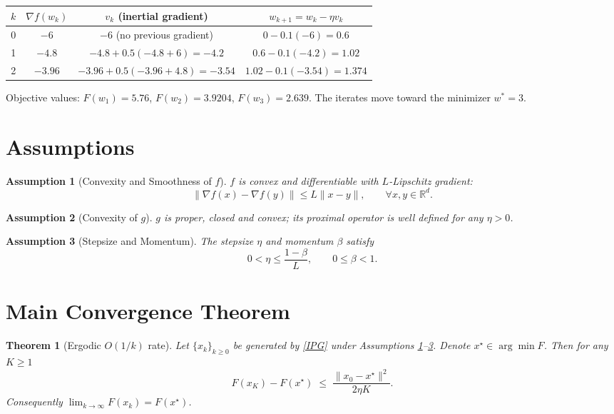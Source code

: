 \documentclass{article}
\newtheorem{theorem}{Theorem}
\newtheorem{assumption}{Assumption}
\newcommand{\R}{\mathbb{R}}
\begin{document}
\begin{center}
\begin{tabular}{c|c|c|c}
$k$ & $\nabla f(w_k)$ & $v_k$ (inertial gradient) & $w_{k+1}=w_k-\eta v_k$ \\ \hline
0 & $-6$ & $-6$ (no previous gradient) & $0-0.1(-6)=0.6$ \\[0.2em]
1 & $-4.8$ & $-4.8+0.5(-4.8+6)=-4.2$ & $0.6-0.1(-4.2)=1.02$ \\[0.2em]
2 & $-3.96$ & $-3.96+0.5(-3.96+4.8)=-3.54$ & $1.02-0.1(-3.54)=1.374$ 
\end{tabular}
\end{center}
Objective values: $F(w_1)=5.76$, $F(w_2)=3.9204$, $F(w_3)=2.639$.
The iterates move toward the minimizer $w^{*}=3$.

\newpage
\section*{Assumptions}
\begin{assumption}[Convexity and Smoothness of $f$]
\label{ass:convex-smooth}
$f$ is convex and differentiable with $L$-Lipschitz gradient:
\[
\|\nabla f(x)-\nabla f(y)\|\le L\|x-y\|,\qquad\forall x,y\in\R^{d}.
\]
\end{assumption}
\begin{assumption}[Convexity of $g$]
\label{ass:g}
$g$ is proper, closed and convex; its proximal operator is well defined for any $\eta>0$.
\end{assumption}
\begin{assumption}[Stepsize and Momentum]
\label{ass:params}
The stepsize $\eta$ and momentum $\beta$ satisfy
\[
0<\eta\le\frac{1-\beta}{L},\qquad 0\le\beta<1.
\]
\end{assumption}

\section*{Main Convergence Theorem}
\begin{theorem}[Ergodic $O(1/k)$ rate]\label{thm:convergence}
Let $\{x_k\}_{k\ge0}$ be generated by \eqref{IPG} under Assumptions \ref{ass:convex-smooth}–\ref{ass:params}. Denote $x^{\star}\in\arg\min F$. Then for any $K\ge1$
\[
F(x_{K})-F(x^{\star})\;\le\;\frac{\|x_{0}-x^{\star}\|^{2}}{2\eta K}.
\tag{T1}
\]
Consequently $\displaystyle\lim_{k\to\infty}F(x_k)=F(x^{\star})$.
\end{theorem}
\end{document}
